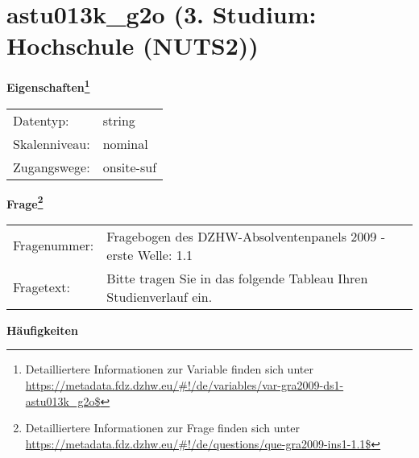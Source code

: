 
    \setcounter{footnote}{0}

    \vspace*{-1.8cm}
	\section{astu013k\_g2o (3. Studium: Hochschule (NUTS2))}
	\label{section:astu013k_g2o}



    \vspace*{0.5cm}
    \noindent\textbf{Eigenschaften\footnote{Detailliertere Informationen zur Variable finden sich unter
		\url{https://metadata.fdz.dzhw.eu/\#!/de/variables/var-gra2009-ds1-astu013k_g2o$}}}\\
	\begin{tabularx}{\hsize}{@{}lX}
	Datentyp: & string \\
	Skalenniveau: & nominal \\
	Zugangswege: &
	  onsite-suf
 \\
    \end{tabularx}



				\vspace*{0.5cm}
                \noindent\textbf{Frage\footnote{Detailliertere Informationen zur Frage finden sich unter
		              \url{https://metadata.fdz.dzhw.eu/\#!/de/questions/que-gra2009-ins1-1.1$}}}\\
				\begin{tabularx}{\hsize}{@{}lX}
					Fragenummer: &
					  Fragebogen des DZHW-Absolventenpanels 2009 - erste Welle:
					  1.1
 \\
					Fragetext: & Bitte tragen Sie in das folgende Tableau Ihren Studienverlauf ein. \\
				\end{tabularx}





        		\vspace*{0.5cm}
                \noindent\textbf{Häufigkeiten}

